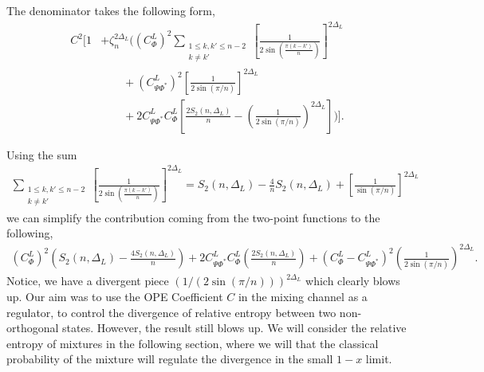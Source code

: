 \documentclass[11pt]{article}
\newcommand{\ep}{\epsilon}
\newcommand{\lb}{\left(}
\newcommand{\rb}{\right)}
\begin{document}
The denominator takes the following form,
\begin{align}
C^2\Bigg[
1
&+ \zeta_n^{2\Delta_L}
\Bigg(
\left(C_{\Phi}^{L}\right)^2
\sum_{\substack{1\le k,k'\le n-2\\ k\neq k'}}
\left[
\frac{1}{2\sin\!\left(\frac{\pi(k-k')}{n}\right)}
\right]^{2\Delta_L}
\nonumber\\
&\qquad
+ \left(C_{\Psi\Phi^*}^{L}\right)^2
\left[
\frac{1}{2\sin(\pi/n)}
\right]^{2\Delta_{L}}
\nonumber\\
&\qquad
+ 2C_{\Psi\Phi^*}^{L}C_{\Phi}^{L}
\left[
\frac{2S_2(n,\Delta_L)}{n}
-
\left(\frac{1}{2\sin(\pi/n)}\right)^{2\Delta_L}
\right]
\Bigg)
\Bigg] .
\end{align}

Using the sum
\begin{align}
    \sum_{\substack{1\le k,k'\le n-2\\ k\neq k'}}
\left[
\frac{1}{2\sin\!\left(\frac{\pi(k-k')}{n}\right)}
\right]^{2\Delta_L} = 
S_2(n,\Delta_L)
-\frac{4}{n}S_2(n,\Delta_L)
+\left[\frac{1}{\sin(\pi/n)}\right]^{2\Delta_L}
\end{align}
we can simplify the contribution coming from the two-point functions to the following,
\begin{align}
\left(C_{\Phi}^{L}\right)^2 \lb S_2(n,\Delta_L) - \frac{4S_2(n,\Delta_L)}{n}\rb + 2C_{\Psi\Phi^*}^{L}C_{\Phi}^{L} \lb\frac{2S_2(n,\Delta_L)}{n}\rb + \lb  C_{\Phi}^{L} - C_{\Psi\Phi^*}^{L} \rb^2\left(\frac{1}{2\sin(\pi/n)}\right)^{2\Delta_L}.
\end{align}
Notice, we have a divergent piece $\lb 1/(2\sin(\pi/n))\rb^{2\Delta_L}$ which clearly blows up. Our aim was to use the OPE Coefficient $C$ in the mixing channel as a regulator, to control the divergence of relative entropy between two non-orthogonal states. However, the result still blows up. 
We will consider the relative entropy of mixtures in the following section, where we will that the classical probability of the mixture will regulate the divergence in the small $1-x$ limit. 




\end{document}
